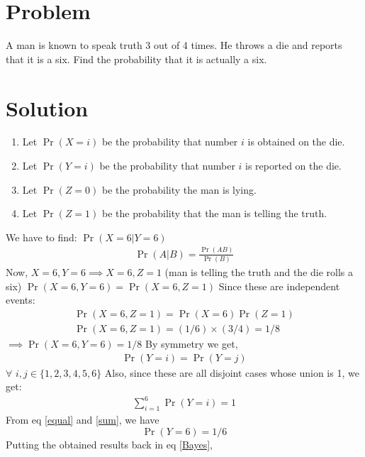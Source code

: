 \documentclass[journal,12pt,twocolumn]{IEEEtran}
\begin{document}
\section*{Problem}
A man is known to speak truth 3 out of 4 times. He throws a die and reports that it is a six. Find the probability that it is actually a six.
\section*{Solution}
\begin{enumerate}
    \item Let $\Pr(X=i)$ be the probability that number $i$ is obtained on the die.
    \item Let $\Pr(Y=i)$ be the probability that number $i$ is reported on the die.
    \item Let $\Pr(Z=0)$ be the probability the man is lying.
    \item Let $\Pr(Z=1)$ be the probability that the man is telling the truth.
\end{enumerate}
We have to find: $\Pr(X=6|Y=6)$
\begin{align}
\Pr(A|B)=\frac{\Pr(AB)}{\Pr(B)} 
\label{Bayes}
\end{align}
Now, $ X=6, Y=6 \implies X=6, Z=1$ 
\newline (man is telling the truth and the die rolls a six)
\newline \newline $\Pr(X=6, Y=6)=\Pr(X=6, Z=1)$
\newline Since these are independent events:
\begin{align}
\Pr(X=6, Z=1)=\Pr(X=6)\Pr(Z=1) \\
\Pr(X=6, Z=1)=(1/6) \times (3/4)=1/8
\end{align}
$\implies \Pr(X=6, Y=6)=1/8 $
\newline \newline By symmetry we get, 
\begin{align}
   \Pr(Y=i) = \Pr(Y=j)
   \label{equal}
\end{align}
$\forall$ $i,j \in \{ 1,2,3,4,5,6 \}$ 
\newline \newline Also, since these are all disjoint cases whose union is 1, we get:
\begin{align}
    \sum_{i=1}^{6} \Pr(Y=i) = 1 
    \label{sum}
\end{align}
From eq \ref{equal} and \ref{sum}, we have 
$$ \Pr(Y=6) = 1/6 $$
Putting the obtained results back in eq \ref{Bayes},
\end{document}
